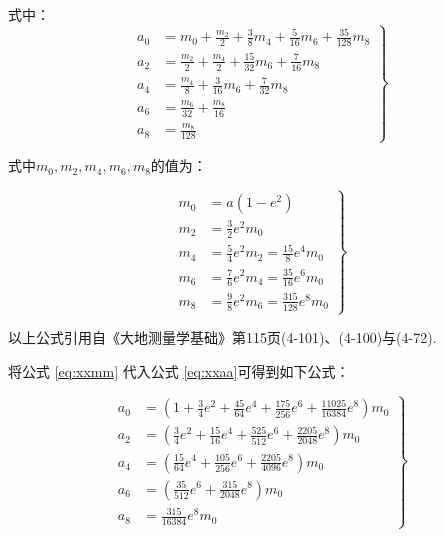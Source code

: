 \begin{enumerate}
          式中：
          \begin{equation}
              \label{eq:xxaa}
              \left  . \begin{aligned}
                  a_0 & = m_0 + \frac{m_2}{2} + \frac{3}{8}m_4 + \frac{5}{16}m_6 + \frac{35}{128}m_8 \\
                  a_2 & = \frac{m_2}{2} + \frac{m_4}{2} + \frac{15}{32}m_6 + \frac{7}{16}m_8         \\
                  a_4 & = \frac{m_4}{8} + \frac{3}{16}m_6 + \frac{7}{32}m_8                          \\
                  a_6 & = \frac{m_6}{32} + \frac{m_8}{16}                                            \\
                  a_8 & = \frac{m_8}{128}
              \end{aligned} \right \}
          \end{equation}

          式中$m_0, m_2, m_4, m_6, m_8$的值为：

          \begin{equation}
              \label{eq:xxmm}
              \left .
              \begin{aligned}
                  m_0 & = a(1-e^2)                                     \\
                  m_2 & = \frac{3}{2}e^2 m_0                           \\
                  m_4 & = \frac{5}{4}e^2 m_2  = \frac{15}{8} e^4 m_0   \\
                  m_6 & = \frac{7}{6}e^2 m_4   = \frac{35}{16} e^6 m_0 \\
                  m_8 & = \frac{9}{8}e^2 m_6 = \frac{315}{128} e^8 m_0
              \end{aligned}
              \right \}
          \end{equation}

          以上公式引用自《大地测量学基础》第115页(4-101)、(4-100)与(4-72).

          将公式 \ref{eq:xxmm} 代入公式  \ref{eq:xxaa}可得到如下公式：

          \begin{equation}
              \label{eq:xxaamm}
              \left  . \begin{aligned}
                  a_0 & =(1 + \frac{3}{4} e^2 + \frac{45}{64} e^4 + \frac{175}{256} e^6 + \frac{11025}{16384} e^8) m_0 \\
                  a_2 & =(\frac{3}{4} e^2 + \frac{15}{16} e^4 + \frac{525}{512} e^6 + \frac{2205}{2048} e^8) m_0       \\
                  a_4 & =(\frac{15}{64} e^4 + \frac{105}{256} e^6 + \frac{2205}{4096} e^8) m_0                         \\
                  a_6 & =(\frac{35}{512} e^6 + \frac{315}{2048} e^8) m_0                                               \\
                  a_8 & = \frac{315}{16384} e^8 m_0
              \end{aligned} \right \}
          \end{equation}


\end{enumerate}
